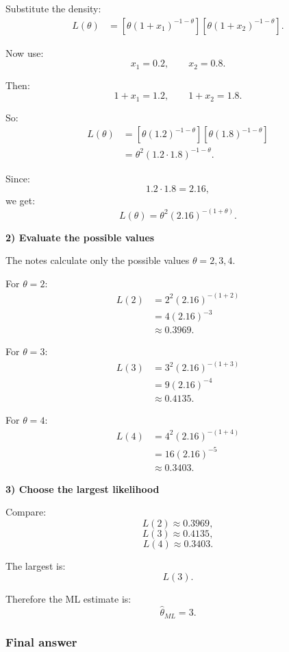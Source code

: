 \documentclass[10pt]{article}
\begin{document}
Substitute the density:
\begin{align*}
L(\theta)
&=
\left[
\theta(1+x_1)^{-1-\theta}
\right]
\left[
\theta(1+x_2)^{-1-\theta}
\right].
\end{align*}

Now use:
\[
x_1=0.2,
\qquad
x_2=0.8.
\]

Then:
\[
1+x_1=1.2,
\qquad
1+x_2=1.8.
\]

So:
\begin{align*}
L(\theta)
&=
\left[
\theta(1.2)^{-1-\theta}
\right]
\left[
\theta(1.8)^{-1-\theta}
\right]
\\[2mm]
&=
\theta^2
\left(1.2\cdot 1.8\right)^{-1-\theta}.
\end{align*}

Since:
\[
1.2\cdot 1.8=2.16,
\]
we get:
\[
L(\theta)
=
\theta^2(2.16)^{-(1+\theta)}.
\]

\textbf{2) Evaluate the possible values}

The notes calculate only the possible values
\(\theta=2,3,4\).

For \(\theta=2\):
\begin{align*}
L(2)
&=
2^2(2.16)^{-(1+2)}
\\[2mm]
&=
4(2.16)^{-3}
\\[2mm]
&\approx 0.3969.
\end{align*}

For \(\theta=3\):
\begin{align*}
L(3)
&=
3^2(2.16)^{-(1+3)}
\\[2mm]
&=
9(2.16)^{-4}
\\[2mm]
&\approx 0.4135.
\end{align*}

For \(\theta=4\):
\begin{align*}
L(4)
&=
4^2(2.16)^{-(1+4)}
\\[2mm]
&=
16(2.16)^{-5}
\\[2mm]
&\approx 0.3403.
\end{align*}

\textbf{3) Choose the largest likelihood}

Compare:
\[
L(2)\approx 0.3969,
\]
\[
L(3)\approx 0.4135,
\]
\[
L(4)\approx 0.3403.
\]

The largest is:
\[
L(3).
\]

Therefore the ML estimate is:
\[
\hat{\theta}_{ML}=3.
\]

\subsubsection*{Final answer}
\end{document}
